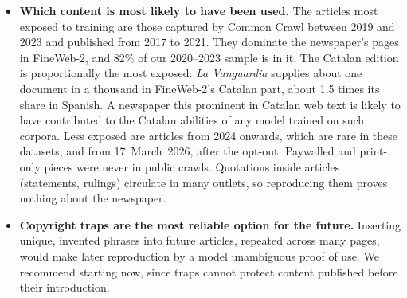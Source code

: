 \documentclass[10pt,a4paper]{article}
\begin{document}
\begin{itemize}
\begin{itemize}
this trace to knowledge of events, not wording, so it is not evidence of copying.
\item \emph{Meta's Llama-3.1.} Articles published between the cutoffs of Llama-3 and Llama-3.1 became more familiar
to the newer model ($p=0.007$). The wording-only version points the same way ($p\approx0.07$). This is the design
closest to evidence about the text; its pre-registered replication pointed the same way but was not significant.
\item \emph{Mistral-7B and Qwen2.5} show weaker traces that depend on the reference model, so they are not robust.
\item \emph{Closed commercial models} (Claude, Gemini, and untested GPT). Our black-box tests found nothing, but those
tests have little power. Larger models memorize more, and corpora of the FineWeb-2 type contain most of our
articles. Their use of the newspaper's text is plausible but unproven. Gemini additionally invents ``literal''
passages and attributes them to the newspaper.
\end{itemize}
\item \textbf{Which content is most likely to have been used.} The articles most exposed to training are those
captured by Common Crawl between 2019 and 2023 and published from 2017 to 2021. They dominate the newspaper's pages
in FineWeb-2, and 82\% of our 2020--2023 sample is in it. The Catalan edition is proportionally
the most exposed: \emph{La Vanguardia} supplies about one document in a thousand in FineWeb-2's Catalan part, about
1.5 times its share in Spanish. A newspaper this prominent in Catalan web text is likely to have contributed to the Catalan
abilities of any model trained on such corpora. Less exposed are articles from 2024 onwards, which are rare in these
datasets, and from 17~March~2026, after the opt-out. Paywalled and print-only pieces were never in public crawls.
Quotations inside articles (statements, rulings) circulate in many outlets, so reproducing them proves nothing about
the newspaper.
\item \textbf{Copyright traps are the most reliable option for the future.} Inserting unique, invented phrases into
future articles, repeated across many pages, would make later reproduction by a model unambiguous proof of use. We
recommend starting now, since traps cannot protect content published before their introduction.
\end{itemize}
\end{document}
